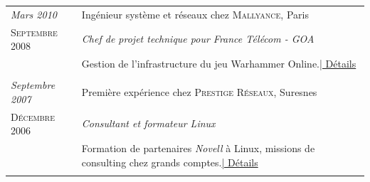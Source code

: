 \documentclass[a4paper,10pt]{article}
\begin{document}
\begin{tabular}{p{}|p{}}
 \emph{Mars 2010} & Ingénieur système et réseaux chez \textsc{Mallyance}, Paris \\\textsc{Septembre 2008}&\emph{Chef de projet technique pour France Télécom - GOA}\\&\footnotesize{Gestion de l'infrastructure du jeu Warhammer Online.\hyperlink{mallyance}{\hfill | \footnotesize Détails}}\\\multicolumn{2}{c}{} \\
 \emph{Septembre 2007} & Première expérience chez \textsc{Prestige Réseaux}, Suresnes \\\textsc{Décembre 2006}&\emph{Consultant et formateur Linux}\\&\footnotesize{Formation de partenaires \emph{Novell} à Linux, missions de consulting chez grands comptes.\newline \hyperlink{prestige}{\hfill | \footnotesize Détails}}\\\multicolumn{2}{c}{} \\
\end{tabular}
\end{document}
